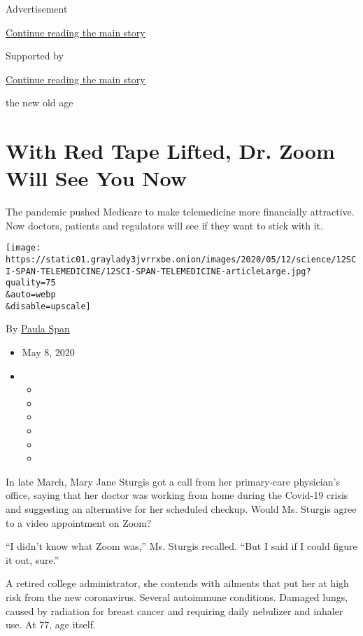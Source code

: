 Advertisement

\protect\hyperlink{after-top}{Continue reading the main story}

Supported by

\protect\hyperlink{after-sponsor}{Continue reading the main story}

the new old age

\hypertarget{with-red-tape-lifted-dr-zoom-will-see-you-now}{%
\section{With Red Tape Lifted, Dr. Zoom Will See You
Now}\label{with-red-tape-lifted-dr-zoom-will-see-you-now}}

The pandemic pushed Medicare to make telemedicine more financially
attractive. Now doctors, patients and regulators will see if they want
to stick with it.

\texttt{[image: https://static01.graylady3jvrrxbe.onion/images/2020/05/12/science/12SCI-SPAN-TELEMEDICINE/12SCI-SPAN-TELEMEDICINE-articleLarge.jpg?quality=75\\\&auto=webp\\\&disable=upscale]}

By \href{https://www.nytimes3xbfgragh.onion/by/paula-span}{Paula Span}

\begin{itemize}
\item
  May 8, 2020
\item
  \begin{itemize}
  \item
  \item
  \item
  \item
  \item
  \item
  \end{itemize}
\end{itemize}

In late March, Mary Jane Sturgis got a call from her primary-care
physician's office, saying that her doctor was working from home during
the Covid-19 crisis and suggesting an alternative for her scheduled
checkup. Would Ms. Sturgis agree to a video appointment on Zoom?

``I didn't know what Zoom was,'' Ms. Sturgis recalled. ``But I said if I
could figure it out, sure.''

A retired college administrator, she contends with ailments that put her
at high risk from the new coronavirus. Several autoimmune conditions.
Damaged lungs, caused by radiation for breast cancer and requiring daily
nebulizer and inhaler use. At 77, age itself.

